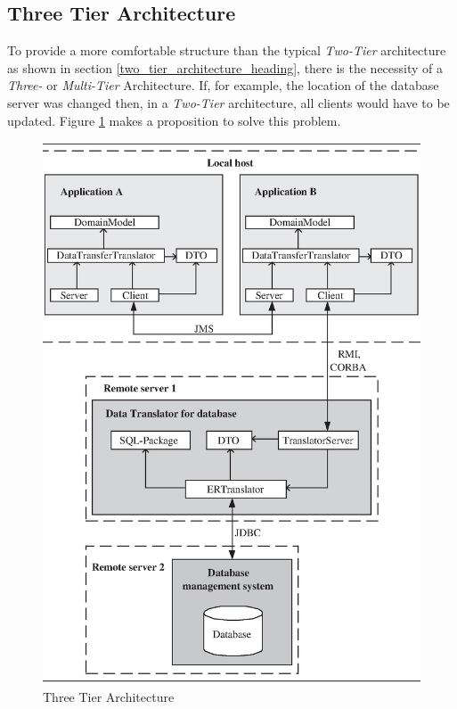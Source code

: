 %
%
%
%
%
%
%

\subsection{Three Tier Architecture}
\label{three_tier_architecture_heading}

To provide a more comfortable structure than the typical \emph{Two-Tier}
architecture as shown in section \ref{two_tier_architecture_heading}, there is
the necessity of a \emph{Three-} or \emph{Multi-Tier} Architecture.
If, for example, the location of the database server was changed then, in a
\emph{Two-Tier} architecture, all clients would have to be updated.
Figure \ref{three_tier_architecture_figure} makes a proposition to solve
this problem.

\begin{figure}[ht]
    \begin{center}
       \includegraphics[scale=0.45]{vector/three_tier_architecture.eps}
       \caption{Three Tier Architecture}
       \label{three_tier_architecture_figure}
    \end{center}
\end{figure}


